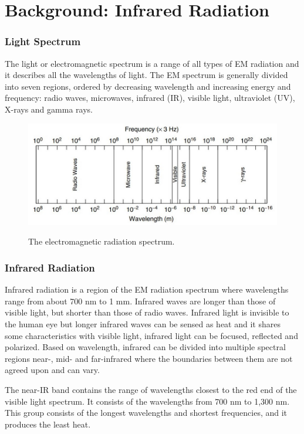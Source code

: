 \section{Background: Infrared Radiation}
\subsubsection{Light Spectrum}
The light or electromagnetic spectrum is a range of all types of EM radiation and it describes all the wavelengths of light. 
The EM spectrum is generally divided into seven regions, ordered by decreasing wavelength and increasing energy and frequency: radio waves, microwaves, infrared (IR), visible light, ultraviolet (UV), X-rays and gamma rays. 


\begin{figure}[H]
\centering
\includegraphics[scale=0.5]{figures/electromagneticRadiation.JPG}
\caption{The electromagnetic radiation spectrum.}\label{fig:electromagneticRadiation}\parencite{electromagnetic}
\end{figure}



\subsubsection{Infrared Radiation}
Infrared radiation is a region of the EM radiation spectrum where wavelengths range from about 700 nm to 1 mm. Infrared waves are longer than those of visible light, but shorter than those of radio waves. 
Infrared light is invisible to the human eye but longer infrared waves can be sensed as heat and it shares some characteristics with visible light, infrared light can be focused, reflected and polarized.
Based on wavelength, infrared can be divided into multiple spectral regions near-, mid- and far-infrared where the boundaries between them are not agreed upon and can vary.
 

The near-IR band contains the range of wavelengths closest to the red end of the visible light spectrum. It consists of the wavelengths from 700 nm to 1,300 nm. This group consists of the longest wavelengths and shortest frequencies, and it produces the least heat.

